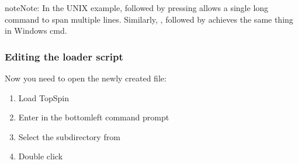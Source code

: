 \documentclass[letterpaper,10pt,english]{sphinxmanual}
\begin{document}
\begin{sphinxadmonition}{note}{Note:}
\sphinxAtStartPar
In the UNIX example, \sphinxcode{\sphinxupquote{\textbackslash{}}} followed by pressing  allows
a single long command to span multiple lines. Similarly, \sphinxcode{\sphinxupquote{\textasciicircum{}}}, followed
by  achieves the same thing in Windows cmd.
\end{sphinxadmonition}


\subsubsection{Editing the loader script}
\label{\detokenize{gui/topspin_install:editing-the-loader-script}}
\sphinxAtStartPar
Now you need to open the newly created file:
\begin{enumerate}
%
\item {} 
\sphinxAtStartPar
Load TopSpin

\item {} 
\sphinxAtStartPar
Enter  in the bottom\sphinxhyphen{}left command prompt

\item {} 
\sphinxAtStartPar
Select the  subdirectory from 

\item {} 
\sphinxAtStartPar
Double click 

\end{enumerate}
\end{document}
